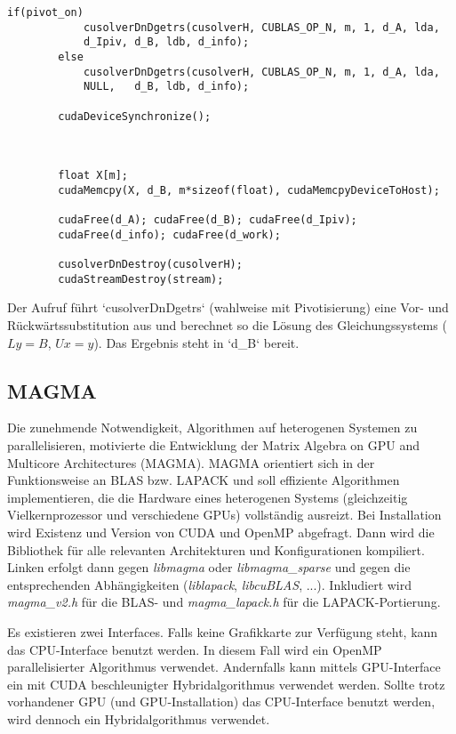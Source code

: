 		\begin{lstlisting}[caption=cuSOLVER: Gleichungssystem lösen]
		if(pivot_on) 
			cusolverDnDgetrs(cusolverH, CUBLAS_OP_N, m, 1, d_A, lda, 
			d_Ipiv, d_B, ldb, d_info);
		else         
			cusolverDnDgetrs(cusolverH, CUBLAS_OP_N, m, 1, d_A, lda, 
			NULL,   d_B, ldb, d_info);
			
		cudaDeviceSynchronize();



		float X[m];
		cudaMemcpy(X, d_B, m*sizeof(float), cudaMemcpyDeviceToHost);

		cudaFree(d_A); cudaFree(d_B); cudaFree(d_Ipiv);
		cudaFree(d_info); cudaFree(d_work);

		cusolverDnDestroy(cusolverH);
		cudaStreamDestroy(stream);
		\end{lstlisting}
		
		Der Aufruf führt \li`cusolverDnDgetrs` (wahlweise mit Pivotisierung) eine Vor- und Rückwärtssubstitution aus und berechnet so die Lösung des Gleichungssystems ($Ly = B$, $Ux = y$). Das Ergebnis steht in \li`d_B` bereit.
		
		\subsection{MAGMA}
		Die zunehmende Notwendigkeit, Algorithmen auf heterogenen Systemen zu parallelisieren, motivierte die Entwicklung der Matrix Algebra on GPU and Multicore Architectures (MAGMA). MAGMA orientiert sich in der Funktionsweise an BLAS bzw. LAPACK und soll effiziente Algorithmen implementieren, die die Hardware eines heterogenen Systems (gleichzeitig Vielkernprozessor und verschiedene GPUs) vollständig ausreizt. Bei Installation wird Existenz und Version von CUDA und OpenMP abgefragt. Dann wird die Bibliothek für alle relevanten Architekturen und Konfigurationen kompiliert. Linken erfolgt dann gegen \textit{libmagma} oder \textit{libmagma{\_}sparse} und gegen die entsprechenden Abhängigkeiten (\textit{liblapack}, \textit{libcuBLAS}, ...). Inkludiert wird \textit{magma{\_}v2.h} für die BLAS- und \textit{magma{\_}lapack.h} für die LAPACK-Portierung.

		Es existieren zwei Interfaces. Falls keine Grafikkarte zur Verfügung steht, kann das CPU-Interface benutzt werden. In diesem Fall wird ein OpenMP parallelisierter Algorithmus verwendet. Andernfalls kann mittels GPU-Interface ein mit CUDA beschleunigter Hybridalgorithmus verwendet werden. Sollte trotz vorhandener GPU (und GPU-Installation) das CPU-Interface benutzt werden, wird dennoch ein Hybridalgorithmus verwendet.
		
